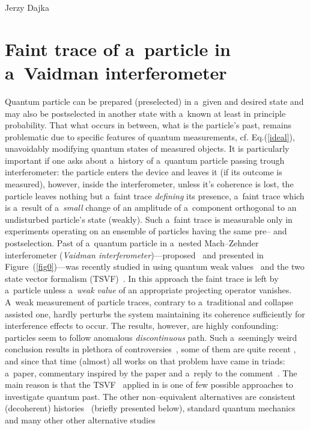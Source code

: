 \begin{artengenv}{Jerzy Dajka}
\section{Faint trace of a~particle in a~Vaidman interferometer}



Quantum particle can be prepared (preselected) in a~given and desired state and may also be postselected in another state with a~known at least in principle probability. That what occurs in between, what is the particle's past, remains problematic due to specific features of quantum measurements, cf. Eq.(\ref{ideal}), unavoidably modifying quantum states of measured objects. It is particularly important if one asks about a~history of a~quantum particle passing trough interferometer: the particle enters the device and leaves it (if its outcome is measured), however, inside the interferometer, unless it's coherence is lost, the particle leaves nothing but a~faint trace {\it defining} its presence, a~faint trace which
is a~result of a~{\it small} change of an amplitude of a~component orthogonal to an undisturbed particle's state (weakly). Such a~faint trace is measurable  only in experiments operating on an
ensemble of particles having the same pre-- and postselection.
%
%
Past of a~quantum particle in a~nested Mach--Zehnder interferometer ({\it Vaidman interferometer})---proposed~\parencite{PhysRevA.87.052104} and presented in Figure~(\ref{fig0})---was recently studied in \parencite{PhysRevA.87.052104} using 
quantum weak values~\parencite{primus,weak,Aharonov2008} and the two state vector formalism (TSVF)~\parencite{Aharonov2008}. In this approach the faint trace is left by a~particle unless a~{\it weak value} of an appropriate projecting operator vanishes. A~weak measurement of particle traces, contrary to a~traditional and collapse assisted one, hardly perturbs the system maintaining its coherence sufficiently for interference effects to occur. The results, however, are highly confounding:  particles seem to follow anomalous {\it discontinuous} path. Such a~seemingly weird conclusion results in plethora of controversies~\parencite{PhysRevA.88.046102,PhysRevA.88.046103}, some of them are quite recent \parencite[cf.][]{lady}, and since that time  (almost) all  works  on that problem  have came in triads: a~paper, commentary inspired by the paper and a~reply to the comment~\parencite{PhysRevA.88.046102,PhysRevA.88.046103}.  
The main reason is that the TSVF~\parencite{Aharonov2008} applied in \parencite{PhysRevA.87.052104} is one of few possible approaches to investigate quantum past. The other non--equivalent alternatives are consistent (decoherent) histories~\parencite{PhysRevA.94.032115,PhysRevA.95.066101} (briefly presented below), standard quantum mechanics~\parencite{PhysRevA.96.022126,PhysRevA.99.026103,PhysRevA.99.026104} and many other other alternative studies

\end{artengenv}
